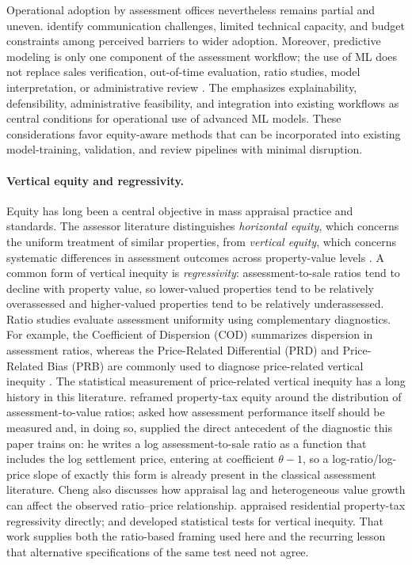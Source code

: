 \documentclass[10pt]{article}
\theoremstyle{definition}
\newcommand{\1}{\mathbf{1}}
\begin{document}
 {Operational adoption by assessment offices nevertheless remains partial and uneven.} \textcite{BidansetRakow2022} identify {communication challenges, limited technical capacity, and budget constraints among perceived barriers to wider adoption}. {Moreover, predictive modeling is only one component of the assessment workflow; the use of ML does not replace sales verification, out-of-time evaluation, ratio studies, model interpretation, or administrative review} \cite{IAAO2020SalesVerification,IAAOAITaskForce2022}. {The} \textcite{IAAOAITaskForce2022} emphasizes explainability, defensibility, administrative feasibility, and integration into existing workflows as central conditions for operational use of advanced ML models. {These considerations favor equity-aware methods that can be incorporated into existing model-training, validation, and review pipelines with minimal disruption.}

\paragraph{Vertical equity and regressivity.}
Equity has long been a central objective in mass appraisal practice and standards. The assessor literature distinguishes \emph{horizontal equity}, which concerns the uniform treatment of similar properties, from \emph{vertical equity}, which concerns systematic differences in assessment outcomes across property-value levels \cite{IAAO2013Ratio,cornia2006property,McMillenSingh2023}. A common form of vertical inequity is \emph{regressivity}: assessment-to-sale ratios tend to decline with property value, so lower-valued properties tend to be relatively overassessed and higher-valued properties tend to be relatively underassessed. {Ratio studies evaluate assessment uniformity using complementary diagnostics. For example, the Coefficient of Dispersion (COD) summarizes dispersion in assessment ratios, whereas the Price-Related Differential (PRD) and Price-Related Bias (PRB) are commonly used to diagnose price-related vertical inequity} \cite{IAAO2013Ratio,IAAO2023VerticalReview}. The statistical measurement of price-related vertical inequity has a long history in this literature. \textcite{PaglinFogarty1972} reframed property-tax equity around the distribution of assessment-to-value ratios; \textcite{Cheng1974} asked how assessment performance itself should be measured and, in doing so, supplied the direct antecedent of the diagnostic this paper trains on: he writes a log assessment-to-sale ratio as a function that includes the log settlement price, entering at coefficient $\theta-1$, so a log-ratio/log-price slope of exactly this form is already present in the classical assessment literature. Cheng also discusses how appraisal lag and heterogeneous value growth can affect the observed ratio--price relationship. \textcite{Edelstein1979} appraised residential property-tax regressivity directly; and \textcite{SundermanEtAl1990} developed statistical tests for vertical inequity. That work supplies both the ratio-based framing used here and the recurring lesson that alternative specifications of the same test need not agree.
\end{document}
